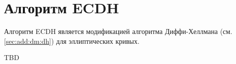 \section{Алгоритм ECDH}

Алгоритм ECDH является модификацией алгоритма Диффи-Хеллмана (см.
\autoref{sec:add:dm:dh}) для эллиптических кривых.

TBD
